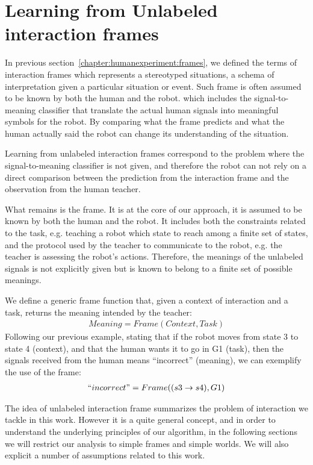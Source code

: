 \section{Learning from Unlabeled interaction frames}

In previous section~\ref{chapter:humanexperiment:frames}, we defined the terms of interaction frames which represents a stereotyped situations, a schema of interpretation given a particular situation or event. Such frame is often assumed to be known by both the human and the robot.  which includes the signal-to-meaning classifier that translate the actual human signals into meaningful symbols for the robot. By comparing what the frame predicts and what the human actually said the robot can change its understanding of the situation.

Learning from unlabeled interaction frames correspond to the problem where the signal-to-meaning classifier is not given, and therefore the robot can not rely on a direct comparison between the prediction from the interaction frame and the observation from the human teacher.

What remains is the frame. It is at the core of our approach, it is assumed to be known by both the human and the robot. It includes both the constraints related to the task, e.g. teaching a robot which state to reach among a finite set of states, and the protocol used by the teacher to communicate to the robot, e.g. the teacher is assessing the robot's actions. Therefore, the meanings of the unlabeled signals is not explicitly given but is known to belong to a finite set of possible meanings.

We define a generic frame function that, given a context of interaction and a task, returns the meaning intended by the teacher:
%
\begin{eqnarray}
Meaning = Frame(Context, Task)
\end{eqnarray}
%
Following our previous example, stating that if the robot moves from state 3 to state 4 (context), and that the human wants it to go in G1 (task), then the signals received from the human means ``incorrect'' (meaning), we can exemplify the use of the frame:
%
\begin{eqnarray}
``incorrect" = Frame((s3 \rightarrow s4), G1)
\end{eqnarray}

\transition

The idea of unlabeled interaction frame summarizes the problem of interaction we tackle in this work. However it is a quite general concept, and in order to understand the underlying principles of our algorithm, in the following sections we will restrict our analysis to simple frames and simple worlds. We will also explicit a number of assumptions related to this work.

